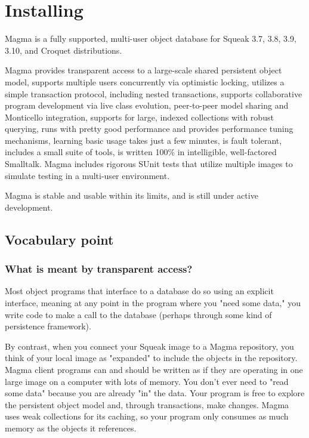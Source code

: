 \documentclass[a4paper,10pt,twoside]{book}
\begin{document}
\fi
\sloppy
\chapter{Installing }


Magma is a fully supported, multi-user object database for Squeak 3.7, 3.8, 3.9, 3.10, and Croquet distributions. 

Magma provides transparent access to a large-scale shared persistent object model, 
supports multiple users concurrently via optimistic locking,  utilizes a simple transaction protocol, including nested transactions, supports collaborative program development via live class evolution, peer-to-peer model sharing and Monticello integration,  supports for large, indexed collections with robust querying, runs with pretty good performance and provides performance tuning mechanisms, 
learning basic usage takes just a few minutes,  is fault tolerant,  includes a small suite of tools, is written 100\% in intelligible, well-factored Smalltalk.
Magma  includes rigorous SUnit tests that utilize multiple images to simulate testing in a multi-user environment.

Magma is stable and usable within its limits, and is still under active development.

\section{Vocabulary point}

\subsection{What is meant by transparent access?}

Most object programs that interface to a database do so using an explicit interface, meaning at any point in the program where you "need some data," you write code to make a call to the database (perhaps through some kind of persistence framework).

By contrast, when you connect your Squeak image to a Magma repository, you think of your local image as "expanded" to include the objects in the repository. Magma client programs can and should be written as if they are operating in one large image on a computer with lots of memory. You don't ever need to "read some data" because you are already "in" the data. Your program is free to explore the persistent object model and, through transactions, make changes. Magma uses weak collections for its caching, so your program only consumes as much memory as the objects it references.
\end{document}
